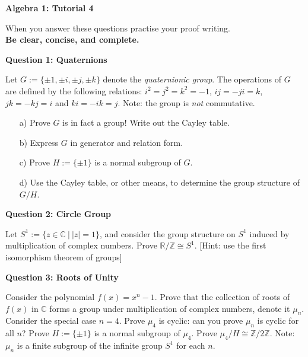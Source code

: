 \documentclass[11pt,twoside, a4paper]{report}
\theoremstyle{plain}
\theoremstyle{definition}
\begin{document}
\begin{center}
 \noindent\makebox[\linewidth]{\rule{14cm}{1.5pt}} 
{\bf Algebra 1: Tutorial 4 }
 \noindent\makebox[\linewidth]{\rule{14cm}{1.5pt}}  
 \noindent\makebox[\linewidth]{\rule{14cm}{3pt}}
\end{center}

\noindent When you answer these questions practise your proof writing.\\
  {\bf Be clear, concise, and complete.}
  
  
\begin{center}
{\bf Question 1: Quaternions}
\end{center}

Let $G:=\{\pm 1, \pm i, \pm j, \pm k\}$ denote the \emph{quaternionic group}. The operations of $G$ are defined by the following relations: $i^{2}=j^{2}=k^{2}=-1$, $ij=-ji=k$, $jk=-kj=i$ and $ki=-ik=j$. Note: the group is \emph{not} commutative. 
\begin{itemize}
\item[a)] Prove $G$ is in fact a group! Write out the Cayley table.
\item[b)] Express $G$ in generator and relation form. 
\item[c)] Prove $H:=\{\pm 1\}$ is a normal subgroup of $G$.
\item[d)] Use the Cayley table, or other means, to determine the group structure of $G/H$. 
\end{itemize} 


  
\begin{center}
{\bf Question 2: Circle Group}
\end{center}

Let $S^{1}:=\{z \in \mathbb{C} \ | \ |z|=1\}$, and consider the group structure on $S^{1}$ induced by multiplication of complex numbers. Prove $\mathbb{R}/\mathbb{Z} \cong S^{1}$. [Hint: use the first isomorphism theorem of groups]

  
\begin{center}
{\bf Question 3: Roots of Unity}
\end{center}

Consider the polynomial $f(x)=x^{n} - 1$. Prove that the collection of roots of $f(x)$ in $\mathbb{C}$ forms a group under multiplication of complex numbers, denote it $\mu_{n}$. Consider the special case $n=4$. Prove $\mu_{4}$ is cyclic: can you prove $\mu_{n}$ is cyclic for all $n$? Prove $H:=\{\pm 1\}$ is a normal subgroup of $\mu_{4}$. Prove $\mu_{4}/H\cong \mathbb{Z}/2\mathbb{Z}$. Note: $\mu_{n}$ is a finite subgroup of the infinite group $S^{1}$ for each $n$. 
\end{document}

